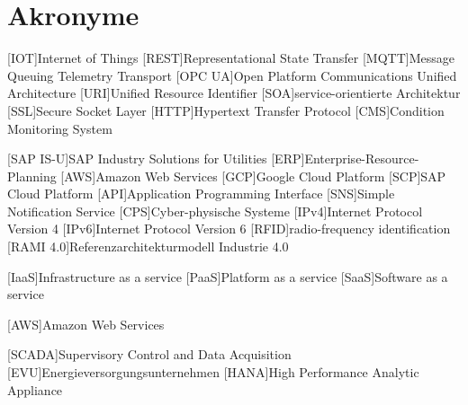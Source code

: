 \section*{Akronyme}            %
\begin{acronym}[SAP IS-U]
  [IOT]{Internet of Things}
  [REST]{Representational State Transfer}
  [MQTT]{Message Queuing Telemetry Transport}
  [OPC UA]{Open Platform Communications Unified Architecture}
  [URI]{Unified Resource Identifier}
  [SOA]{service-orientierte Architektur}
  [SSL]{Secure Socket Layer}
  [HTTP]{Hypertext Transfer Protocol}
  [CMS]{Condition Monitoring System}

  [SAP IS-U]{SAP Industry Solutions for Utilities}
  [ERP]{Enterprise-Resource-Planning}
  [AWS]{Amazon Web Services}
  [GCP]{Google Cloud Platform}
  [SCP]{SAP Cloud Platform}
  [API]{Application Programming Interface}
  [SNS]{Simple Notification Service}
  [CPS]{Cyber-physische Systeme}
  [IPv4]{Internet Protocol Version 4}
  [IPv6]{Internet Protocol Version 6}
  [RFID]{radio-frequency identification}
  [RAMI 4.0]{Referenzarchitekturmodell Industrie 4.0}

[IaaS]{Infrastructure as a service}
[PaaS]{Platform as a service}
[SaaS]{Software as a service}

[AWS]{Amazon Web Services}


[SCADA]{Supervisory Control and Data Acquisition}
[EVU]{Energieversorgungsunternehmen}
[HANA]{High Performance Analytic Appliance}

\end{acronym}

\newpage

\listoffigures
{}
\listoftables
{}
\lstlistoflistings
{}
\newpage
